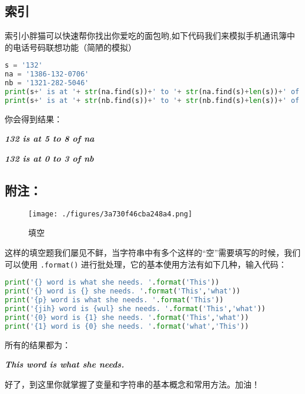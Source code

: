 \subsection{索引}
索引小胖猫可以快速帮你找出你爱吃的面包哟,如下代码我们来模拟手机通讯簿中的电话号码联想功能（简陋的模拟）

\begin{lstlisting}[language=python]
s = '132'
na = '1386-132-0706'
nb = '1321-282-5046'
print(s+' is at '+ str(na.find(s))+' to '+ str(na.find(s)+len(s))+' of na')
print(s+' is at '+ str(nb.find(s))+' to '+ str(nb.find(s)+len(s))+' of nb')
\end{lstlisting}
你会得到结果：

\textsl{\textbf{132 is at 5 to 8 of na}}

\textsl{\textbf{132 is at 0 to 3 of nb}}
\subsection{附注：}
\begin{figure}[ht]
\centering
\texttt{[image: ./figures/3a730f46cba248a4.png]}
\caption{填空} \label{fig_Strsi_2}
\end{figure}
这样的填空题我们屡见不鲜，当字符串中有多个这样的“空”需要填写的时候，我们可以使用 \verb|.format()| 进行批处理，它的基本使用方法有如下几种，输入代码：
\begin{lstlisting}[language=python]
print('{} word is what she needs. '.format('This'))
print('{} word is {} she needs. '.format('This','what'))
print('{p} word is what she needs. '.format('This'))
print('{jih} word is {wul} she needs. '.format('This','what'))
print('{0} word is {1} she needs. '.format('This','what'))
print('{1} word is {0} she needs. '.format('what','This'))
\end{lstlisting}
所有的结果都为：

\textsl{\textbf{This word is what she needs.}}

好了，到这里你就掌握了变量和字符串的基本概念和常用方法。加油！
